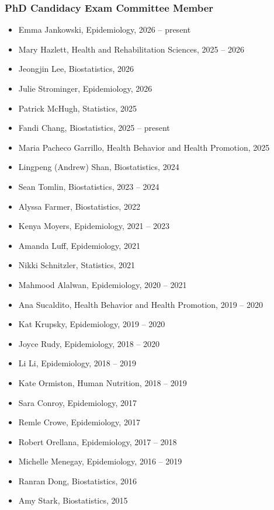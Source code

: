 \documentclass[
  english,
  letterpaper,
  DIV=11,
  numbers=noendperiod]{scrartcl}
\providecommand{\tightlist}{%
  \setlength{\itemsep}{0pt}\setlength{\parskip}{0pt}}
\begin{document}
\subsubsection{PhD Candidacy Exam Committee
Member}\label{phd-candidacy-exam-committee-member}

\begin{itemize}
\tightlist
\item
  Emma Jankowski, Epidemiology, 2026 -- present
\item
  Mary Hazlett, Health and Rehabilitation Sciences, 2025 -- 2026
\item
  Jeongjin Lee, Biostatistics, 2026
\item
  Julie Strominger, Epidemiology, 2026
\item
  Patrick McHugh, Statistics, 2025
\item
  Fandi Chang, Biostatistics, 2025 -- present
\item
  Maria Pacheco Garrillo, Health Behavior and Health Promotion, 2025
\item
  Lingpeng (Andrew) Shan, Biostatistics, 2024
\item
  Sean Tomlin, Biostatistics, 2023 -- 2024
\item
  Alyssa Farmer, Biostatistics, 2022
\item
  Kenya Moyers, Epidemiology, 2021 -- 2023
\item
  Amanda Luff, Epidemiology, 2021
\item
  Nikki Schnitzler, Statistics, 2021
\item
  Mahmood Alalwan, Epidemiology, 2020 -- 2021
\item
  Ana Sucaldito, Health Behavior and Health Promotion, 2019 -- 2020
\item
  Kat Krupsky, Epidemiology, 2019 -- 2020
\item
  Joyce Rudy, Epidemiology, 2018 -- 2020
\item
  Li Li, Epidemiology, 2018 -- 2019
\item
  Kate Ormiston, Human Nutrition, 2018 -- 2019
\item
  Sara Conroy, Epidemiology, 2017
\item
  Remle Crowe, Epidemiology, 2017
\item
  Robert Orellana, Epidemiology, 2017 -- 2018
\item
  Michelle Menegay, Epidemiology, 2016 -- 2019
\item
  Ranran Dong, Biostatistics, 2016
\item
  Amy Stark, Biostatistics, 2015

\end{itemize}
\end{document}
